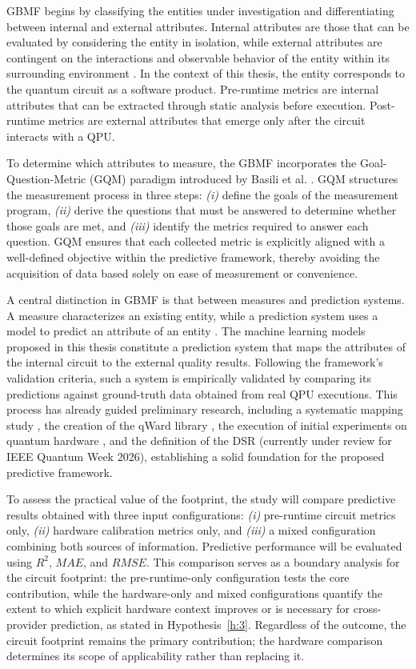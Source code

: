 \documentclass{article}
\begin{document}
GBMF begins by classifying the entities under investigation and differentiating between internal and external attributes. Internal attributes are those that can be evaluated by considering the entity in isolation, while external attributes are contingent on the interactions and observable behavior of the entity within its surrounding environment \cite{alma991005387727907681_2015}. In the context of this thesis, the entity corresponds to the quantum circuit as a software product. Pre-runtime metrics are internal attributes that can be extracted through static analysis before execution. Post-runtime metrics are external attributes that emerge only after the circuit interacts with a QPU.

To determine which attributes to measure, the GBMF incorporates the Goal-Question-Metric (GQM) paradigm introduced by Basili et al. \cite{basiliGQM_1994}. GQM structures the measurement process in three steps: \emph{(i)} define the goals of the measurement program, \emph{(ii)} derive the questions that must be answered to determine whether those goals are met, and \emph{(iii)} identify the metrics required to answer each question. GQM ensures that each collected metric is explicitly aligned with a well-defined objective within the predictive framework, thereby avoiding the acquisition of data based solely on ease of measurement or convenience.

A central distinction in GBMF is that between measures and prediction systems. A measure characterizes an existing entity, while a prediction system uses a model to predict an attribute of an entity \cite{alma991005387727907681_2015}. The machine learning models proposed in this thesis constitute a prediction system that maps the attributes of the internal circuit to the external quality results. Following the framework's validation criteria, such a system is empirically validated by comparing its predictions against ground-truth data obtained from real QPU executions. This process has already guided preliminary research, including a systematic mapping study \cite{marquezQualityConcernsWhena_2025}, the creation of the qWard library \cite{QiskitqwardFrameworkAnalyzing}, the execution of initial experiments on quantum hardware \cite{ieeevTp2025}, and the definition of the DSR (currently under review for IEEE Quantum Week 2026), establishing a solid foundation for the proposed predictive framework.

To assess the practical value of the footprint, the study will compare predictive results obtained with three input configurations: \emph{(i)} pre-runtime circuit metrics only, \emph{(ii)} hardware calibration metrics only, and \emph{(iii)} a mixed configuration combining both sources of information. Predictive performance will be evaluated using $R^2$, $MAE$, and $RMSE$. This comparison serves as a boundary analysis for the circuit footprint: the pre-runtime-only configuration tests the core contribution, while the hardware-only and mixed configurations quantify the extent to which explicit hardware context improves or is necessary for cross-provider prediction, as stated in Hypothesis~\ref{h:3}. Regardless of the outcome, the circuit footprint remains the primary contribution; the hardware comparison determines its scope of applicability rather than replacing it.
\end{document}
